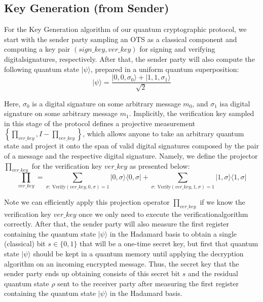 \documentclass[12pt]{article}
\begin{document}
    
    \subsection{Key Generation (from Sender)}
    \label{subsec:key-generation}

    For the Key Generation algorithm of our quantum cryptographic protocol, we start with the sender party sampling an OTS as a classical component and computing a key pair $(sign\_key, ver\_key)$ for signing and verifying digital\break signatures, respectively. After that, the sender party will also compute the following quantum state $|\psi\rangle$, prepared in a uniform quantum superposition:
    $$ |\psi\rangle = \frac{|0, 0, {\sigma}_{0}\rangle + |1, 1, {\sigma}_{1}\rangle}{\sqrt{2}} $$

    \noindent Here, ${\sigma}_{0}$ is a digital signature on some arbitrary message ${m}_{0}$, and ${\sigma}_{1}$ is\break a digital signature on some arbitrary message ${m}_{1}$. Implicitly, the verification key sampled in this stage of the protocol defines a projective measurement $\left\{ {\prod}_{ver\_key}, I - {\prod}_{ver\_key} \right\}$, which allows anyone to take an arbitrary quantum state and project it onto the span of valid digital signatures composed by the pair of a message and the respective digital signature. Namely, we define the projector ${\prod}_{ver\_key}$ for the verification key $ver\_key$ as presented below:
    $$ {\prod}_{ver\_key} = \sum_{\sigma:\ \mathrm{\text{Verify}}(ver\_key, 0, \sigma) = 1} |0, \sigma\rangle \langle0, \sigma| + \sum_{\sigma:\ \mathrm{\text{Verify}}(ver\_key, 1, \sigma) = 1} |1, \sigma\rangle \langle1, \sigma| $$

    \noindent Note we can efficiently apply this projection operator ${\prod}_{ver\_key}$ if we know the verification key $ver\_key$ once we only need to execute the verification\break algorithm correctly. After that, the sender party will also measure the first register containing the quantum state $|\psi\rangle$ in the Hadamard basis to obtain a single (classical) bit $s \in \{0, 1\}$ that will be a one-time secret key, but first that quantum state $|\psi\rangle$ should be kept in a quantum memory until applying the decryption algorithm on an incoming encrypted message. Thus, the secret key that the sender party ends up obtaining consists of this secret bit $s$ and the residual quantum state $\rho$ sent to the receiver party after measuring the first register containing the quantum state $|\psi\rangle$ in the Hadamard basis.
\end{document}
